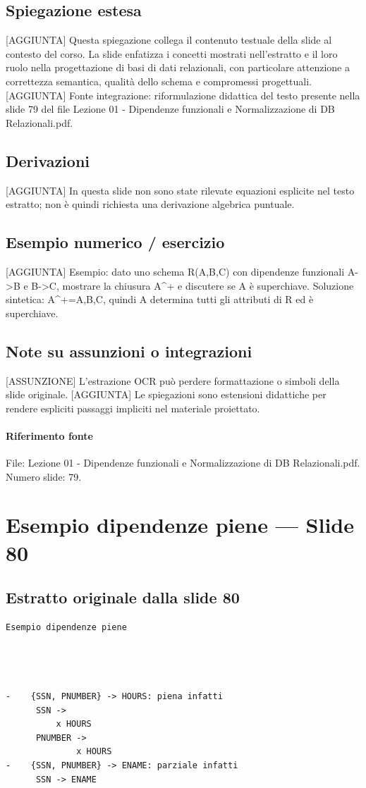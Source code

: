 \documentclass[11pt]{article}
\begin{document}
\subsection*{Spiegazione estesa}
[AGGIUNTA] Questa spiegazione collega il contenuto testuale della slide al contesto del corso. La slide enfatizza i concetti mostrati nell'estratto e il loro ruolo nella progettazione di basi di dati relazionali, con particolare attenzione a correttezza semantica, qualità dello schema e compromessi progettuali.
[AGGIUNTA] Fonte integrazione: riformulazione didattica del testo presente nella slide 79 del file Lezione 01 - Dipendenze funzionali e Normalizzazione di DB Relazionali.pdf.
\subsection*{Derivazioni}
[AGGIUNTA] In questa slide non sono state rilevate equazioni esplicite nel testo estratto; non è quindi richiesta una derivazione algebrica puntuale.
\subsection*{Esempio numerico / esercizio}
[AGGIUNTA] Esempio: dato uno schema R(A,B,C) con dipendenze funzionali A->B e B->C, mostrare la chiusura A^+ e discutere se A è superchiave. Soluzione sintetica: A^+={A,B,C}, quindi A determina tutti gli attributi di R ed è superchiave.
\subsection*{Note su assunzioni o integrazioni}
[ASSUNZIONE] L'estrazione OCR può perdere formattazione o simboli della slide originale.
[AGGIUNTA] Le spiegazioni sono estensioni didattiche per rendere espliciti passaggi impliciti nel materiale proiettato.
\paragraph{Riferimento fonte} File: Lezione 01 - Dipendenze funzionali e Normalizzazione di DB Relazionali.pdf. Numero slide: 79.
\section{Esempio dipendenze piene --- Slide 80}
\subsection*{Estratto originale dalla slide 80}
\begin{lstlisting}
Esempio dipendenze piene




-    {SSN, PNUMBER} -> HOURS: piena infatti
      SSN ->
          x HOURS
      PNUMBER ->
              x HOURS
-    {SSN, PNUMBER} -> ENAME: parziale infatti
      SSN -> ENAME
\end{lstlisting}
\end{document}
